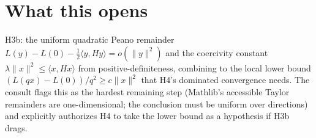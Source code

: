 \documentclass[11pt]{article}
\begin{document}
\section{What this opens}

H3b: the uniform quadratic Peano remainder
$L(y) - L(0) - \tfrac12\langle y, Hy\rangle = o(\|y\|^2)$ and the
coercivity constant $\lambda \|x\|^2 \le \langle x, Hx\rangle$ from
positive-definiteness, combining to the local lower bound
$(L(qx) - L(0))/q^2 \ge c\|x\|^2$ that H4's dominated convergence
needs. The consult flags this as the hardest remaining step (Mathlib's
accessible Taylor remainders are one-dimensional; the conclusion must
be uniform over directions) and explicitly authorizes H4 to take the
lower bound as a hypothesis if H3b drags.
\end{document}
